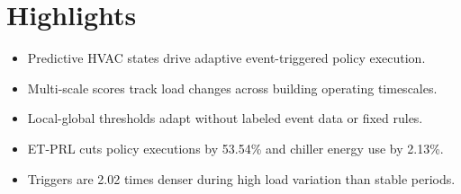 \documentclass[12pt]{article}
\begin{document}
\section*{Highlights}

\begin{itemize}
\item Predictive HVAC states drive adaptive event-triggered policy execution.
\item Multi-scale scores track load changes across building operating timescales.
\item Local-global thresholds adapt without labeled event data or fixed rules.
\item ET-PRL cuts policy executions by 53.54\% and chiller energy use by 2.13\%.
\item Triggers are 2.02 times denser during high load variation than stable periods.
\end{itemize}
\end{document}
